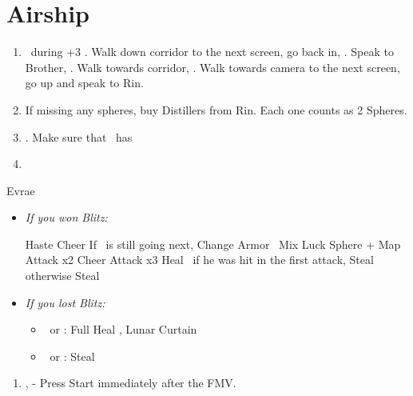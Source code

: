 \chapter{Airship}

\begin{enumerate}
  \item \sd\ during \cs+3 \skippablefmv. Walk down corridor to the next screen, go back in, \sd. Speak to Brother, \sd. Walk towards corridor, \sd. Walk towards camera to the next screen, go up and speak to Rin.
  \item If missing any spheres, buy Distillers from Rin. Each one counts as 2 Spheres.
  \item \save. Make sure that \rikku\ has \od
  \item \formation{\tidus}{\rikku}{\kimahri}
\end{enumerate}
\vfill
\begin{battle}[32000]{Evrae}
  \begin{itemize}
    \item \textit{If you won Blitz:}
          \begin{itemize}
            \tidusf Haste \tidus
            \tidusf Cheer
            \tidusf If \tidus\ is still going next, Change Armor
            \rikkuf \od\ Mix Luck Sphere + Map
            \tidusf Attack x2
            \tidusf Cheer
            \tidusf Attack x3
            \kimahrif Heal \tidus\ if he was hit in the first attack, Steal otherwise
            \rikkuf Steal
          \end{itemize}
    \item \textit{If you lost Blitz:}
          \begin{itemize}
            \tidusf Haste \tidus
            \tidusf Cheer x2
            \tidusf Equip Baroque Sword
            \tidusf Attack x6
            \rikkuf \od\ Mix Luck Sphere + Map
            \item \kimahri\ or \rikku: Full Heal \tidus, Lunar Curtain \tidus
            \item \kimahri\ or \rikku: Steal
          \end{itemize}
  \end{itemize}
\end{battle}
\begin{enumerate}[resume]
  \item \sd, \skippablefmv[3:00] - Press Start immediately after the FMV.
\end{enumerate}
